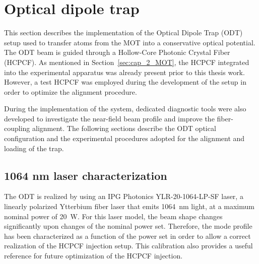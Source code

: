 



\section{Optical dipole trap}

This section describes the implementation of the Optical Dipole Trap (ODT) setup used to transfer atoms from the MOT into a conservative optical potential. The ODT beam is guided through a Hollow-Core Photonic Crystal Fiber (HCPCF). As mentioned in Section~\ref{sec:cap_2_MOT}, the HCPCF integrated into the experimental apparatus was already present prior to this thesis work. However, a test HCPCF was employed during the development of the setup in order to optimize the alignment procedure.

During the implementation of the system, dedicated diagnostic tools were also developed to investigate the near-field beam profile and improve the fiber-coupling alignment. The following sections describe the ODT optical configuration and the experimental procedures adopted for the alignment and loading of the trap.

\subsection{1064 nm laser characterization}\label{sec:laser_beam_characterization}


The ODT is realized by using an IPG Photonics YLR-20-1064-LP-SF laser, a linearly polarized Ytterbium fiber laser that emits 1064~nm light, at a maximum nominal power of 20~W. For this laser model, the beam shape changes significantly upon changes of the nominal power set. Therefore, the mode profile has been characterized as a function of the power set in order to allow a correct realization of the HCPCF injection setup. This calibration also provides a useful reference for future optimization of the HCPCF injection.

